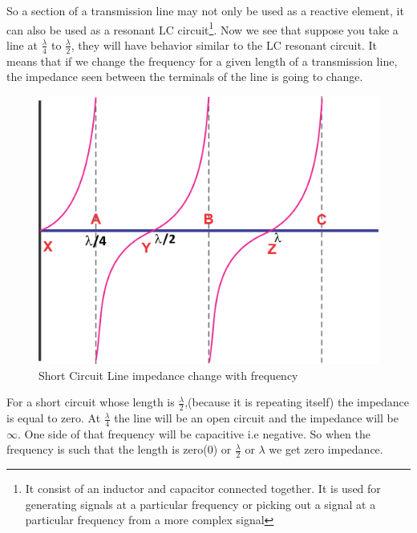 So a section of a transmission line may not only be used as a reactive element, it can also be used as a resonant LC circuit\footnote{It consist of an inductor and capacitor connected together. It is used for generating signals at a particular frequency or picking out a signal at a particular frequency from a more complex signal}. Now we see that suppose you take a line at $ \frac{\lambda}{4} $ to $ \frac{\lambda}{2} $, they will have behavior similar to the LC resonant circuit.\newline
It means that if we change the frequency for a given length of a transmission line, the impedance seen between the terminals of the line is going to change.
\begin{figure}[h]
\centering
\includegraphics[scale=0.5]{./graphics/group10diagram10}
\caption{Short Circuit Line impedance change with frequency}
\end{figure}

For a short circuit whose length is $ \frac{\lambda}{2} $,(because it is repeating itself) the impedance is equal to zero. At $ \frac{\lambda}{4} $ the line will be an open circuit and the impedance will be $\infty$. One side of that frequency will be capacitive i.e negative. So when  the frequency is such that the length is zero(0) or $ \frac{\lambda}{2} $ or $ \lambda $ we get zero impedance.\\

